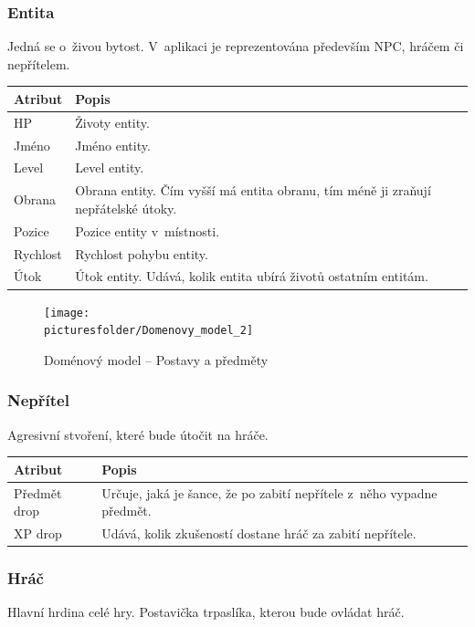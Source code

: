 \documentclass[12pt,a4paper]{article}
\def\picturesfolder{obrazky}
\begin{document}
\subsubsection{Entita}
Jedná se o~živou bytost. V~aplikaci je reprezentována především NPC, hráčem či
nepřítelem.

\def\arraystretch{1.75}
\noindent
\begin{tabularx}{\textwidth}{|l|>{\raggedright}X|}
\hline
\cellcolor{black!80}\textcolor{gray!25}{\textbf{Atribut}} & \cellcolor{black!80}\textcolor{gray!20}{\textbf{Popis}}\tabularnewline \hline
 HP & Životy entity. \tabularnewline
\hline
 Jméno & Jméno entity. \tabularnewline
\hline
 Level & Level entity. \tabularnewline
\hline
 Obrana & Obrana entity. Čím vyšší má entita obranu,
                tím méně ji zraňují nepřátelské útoky. \tabularnewline
\hline
 Pozice & Pozice entity v~místnosti. \tabularnewline
\hline
 Rychlost & Rychlost pohybu entity. \tabularnewline
\hline
 Útok & Útok entity. Udává, kolik entita ubírá životů ostatním entitám.
\tabularnewline\hline
\end{tabularx}

\begin{figure}
\begin{center}
  \texttt{[image: \\picturesfolder/Domenovy\_model\_2]}
  \caption{Doménový model -- Postavy a předměty}
  \label{domenovy:postavy}
\end{center}
\end{figure}

\subsubsection{Nepřítel}
Agresivní stvoření, které bude útočit na hráče.

\noindent
\begin{tabularx}{\textwidth}{|l|>{\raggedright}X|}
\hline
\cellcolor{black!80}\textcolor{gray!25}{\textbf{Atribut}} & \cellcolor{black!80}\textcolor{gray!20}{\textbf{Popis}}\tabularnewline \hline
 Předmět drop & Určuje, jaká je šance, že po zabití nepřítele
  z~něho  vypadne předmět. \tabularnewline
\hline
 XP drop & Udává, kolik zkušeností dostane hráč za zabití
  nepřítele.
\tabularnewline\hline
\end{tabularx}

\subsubsection{Hráč}
Hlavní hrdina celé hry. Postavička trpaslíka, kterou bude ovládat hráč.
\end{document}
